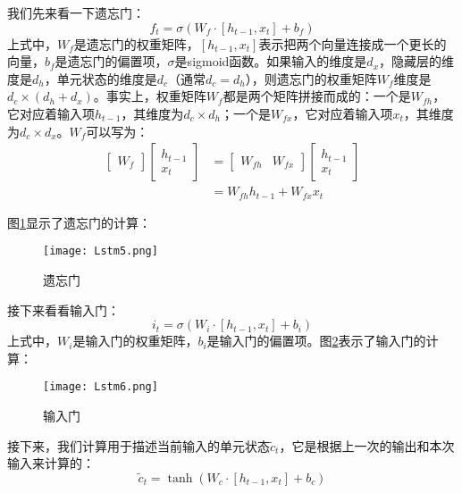 我们先来看一下遗忘门：
\begin{equation}
	\label{eq:Lstm1}
	{f}_t=\sigma(W_f\cdot[{h}_{t-1},{x}_t]+{b}_f)
\end{equation}
上式中，\(W_f\)是遗忘门的权重矩阵，\([{h}_{t-1},{x}_t]\)表示把两个向量连接成一个更长的向量，\({b}_f\)是遗忘门的偏置项，\(\sigma\)是sigmoid函数。如果输入的维度是\(d_x\)，隐藏层的维度是\(d_h\)，单元状态的维度是\(d_c\)（通常\(d_c=d_h\)），则遗忘门的权重矩阵\(W_f\)维度是\( d_c\times (d_h+d_x)\)。事实上，权重矩阵\(W_f\)都是两个矩阵拼接而成的：一个是\(W_{fh}\)，它对应着输入项\({h}_{t-1}\)，其维度为\(d_c\times d_h\)；一个是\(W_{fx}\)，它对应着输入项\({x}_t\)，其维度为\(d_c\times d_x\)。\(W_f\)可以写为：
\begin{align*}
	\begin{bmatrix}W_f\end{bmatrix}\begin{bmatrix}{h}_{t-1} \\
		{x}_t\end{bmatrix} & =\begin{bmatrix}W_{fh}&W_{fx}\end{bmatrix}\begin{bmatrix}{h}_{t-1} \\
		{x}_t\end{bmatrix} \\
	                                                    & =W_{fh}{h}_{t-1}+W_{fx}{x}_t
\end{align*}

图\ref{fig:Lstm5}显示了遗忘门的计算：
\begin{figure}[!h]
	\centering
	\texttt{[image: Lstm5.png]}
	\caption{遗忘门}
	\label{fig:Lstm5}
\end{figure}

接下来看看输入门：
\begin{equation}
	\label{eq:Lstm2}
	{i}_t=\sigma(W_i\cdot[{h}_{t-1},{x}_t]+{b}_i)
\end{equation}
上式中，\(W_i\)是输入门的权重矩阵，\({b}_i\)是输入门的偏置项。图\ref{fig:Lstm6}表示了输入门的计算：
\begin{figure}[!h]
	\centering
	\texttt{[image: Lstm6.png]}
	\caption{输入门}
	\label{fig:Lstm6}
\end{figure}

接下来，我们计算用于描述当前输入的单元状态\({\tilde{c}}_t\)，它是根据上一次的输出和本次输入来计算的：
\begin{equation}
	\label{eq:Lstm3}
	{\tilde{c}}_t=\tanh(W_c\cdot[{h}_{t-1},{x}_t]+{b}_c)
\end{equation}


